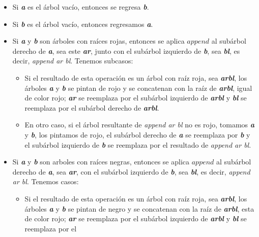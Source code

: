 \begin{itemize}
    \item Si \textbf{\textit{a}} es el \'arbol vacío, entonces se regresa \textbf{\textit{b}}.
    \item Si \textbf{\textit{b}} es el \'arbol vacío, entonces regresamos \textbf{\textit{a}}.
    \item Si \textbf{\textit{a}} y \textbf{\textit{b}} son \'arboles con raíces rojas, entonces se 
    aplica \hyperref[func_app]{$append$} al subárbol derecho de \textbf{\textit{a}}, sea este \textbf{\textit{ar}}, 
    junto con el subárbol izquierdo de \textbf{\textit{b}}, sea \textbf{\textit{bl}}, es decir, 
    \textit{append ar bl}. Tenemos subcasos:
    \begin{itemize}
      \item Si el resultado de esta operación es un árbol con raíz roja, sea \textbf{\textit{arbl}},
      los \'arboles \textbf{\textit{a}} y \textbf{\textit{b}} se pintan de rojo y se concatenan con 
      la raíz de \textbf{\textit{arbl}}, igual de color rojo; \textbf{\textit{ar}} se reemplaza por 
      el subárbol izquierdo de \textbf{\textit{arbl}} y \textbf{\textit{bl}} se reemplaza por el
      subárbol derecho de \textbf{\textit{arbl}}.
      \item En otro caso, si el \'arbol resultante de \textit{append ar bl} no es rojo, tomamos 
      \textbf{\textit{a}} y \textbf{\textit{b}}, los pintamos de rojo, el subárbol derecho de
      \textbf{\textit{a}} se reemplaza por \textbf{\textit{b}} y el subárbol izquierdo de 
      \textbf{\textit{b}} se reemplaza por el resultado de \textit{append ar bl}.
    \end{itemize}
    \item Si \textbf{\textit{a}} y \textbf{\textit{b}} son arboles con raíces negras, entonces se 
    aplica \hyperref[func_app]{$append$} al subárbol derecho de \textbf{\textit{a}}, sea \textbf{\textit{ar}}, con el
    subárbol izquierdo de \textbf{\textit{b}}, sea \textbf{\textit{bl}}, es decir, \textit{append
    ar bl}. Tenemos casos:
    \begin{itemize}
      \item Si el resultado de esta operación es un árbol con raíz roja, sea \textbf{\textit{arbl}},
      los \'arboles \textbf{\textit{a}} y \textbf{\textit{b}} se pintan de negro y se concatenan con
      la raíz de \textbf{\textit{arbl}}, esta de color rojo; \textbf{\textit{ar}} se reemplaza por 
      el subárbol izquierdo de \textbf{\textit{arbl}} y \textbf{\textit{bl}} se reemplaza por el 

\end{itemize}
\end{itemize}
